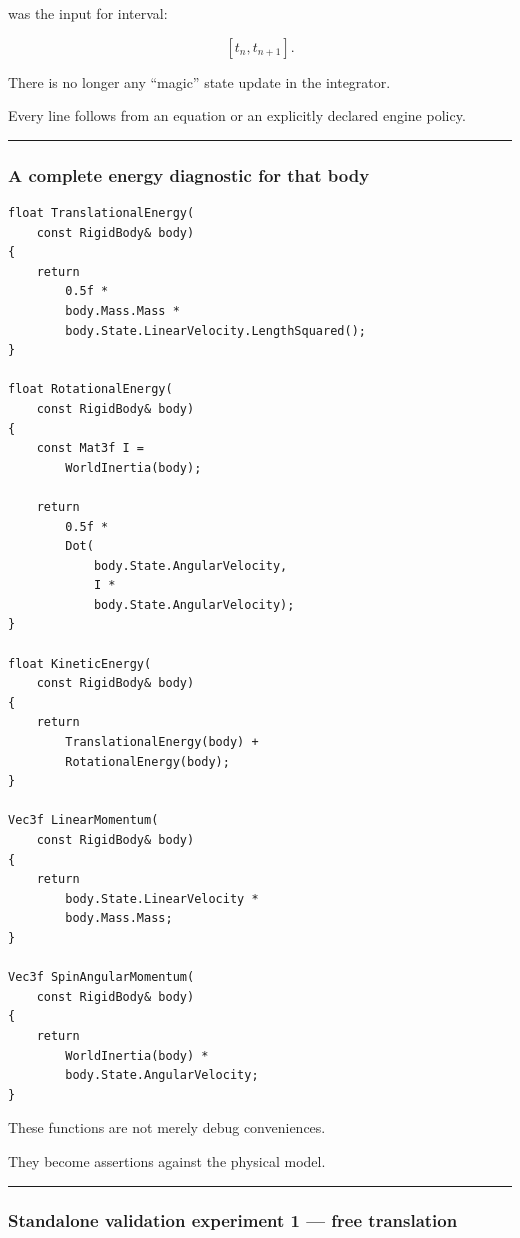 was the input for interval:

\[
[t_n,t_{n+1}].
\]

There is no longer any ``magic'' state update in the integrator.

Every line follows from an equation or an explicitly declared engine policy.

\begin{center}\rule{0.5\linewidth}{0.5pt}\end{center}

\subsubsection{A complete energy diagnostic for that body}\label{a-complete-energy-diagnostic-for-that-body}

\begin{verbatim}
float TranslationalEnergy(
    const RigidBody& body)
{
    return
        0.5f *
        body.Mass.Mass *
        body.State.LinearVelocity.LengthSquared();
}

float RotationalEnergy(
    const RigidBody& body)
{
    const Mat3f I =
        WorldInertia(body);

    return
        0.5f *
        Dot(
            body.State.AngularVelocity,
            I *
            body.State.AngularVelocity);
}

float KineticEnergy(
    const RigidBody& body)
{
    return
        TranslationalEnergy(body) +
        RotationalEnergy(body);
}

Vec3f LinearMomentum(
    const RigidBody& body)
{
    return
        body.State.LinearVelocity *
        body.Mass.Mass;
}

Vec3f SpinAngularMomentum(
    const RigidBody& body)
{
    return
        WorldInertia(body) *
        body.State.AngularVelocity;
}
\end{verbatim}

These functions are not merely debug conveniences.

They become assertions against the physical model.

\begin{center}\rule{0.5\linewidth}{0.5pt}\end{center}

\subsubsection{Standalone validation experiment 1 --- free translation}\label{standalone-validation-experiment-1-free-translation}

